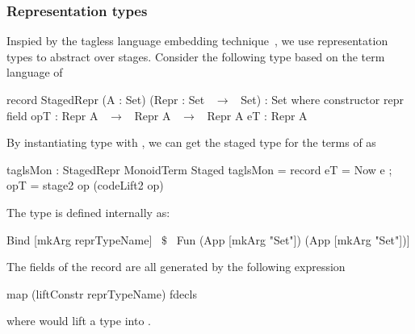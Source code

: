\begin{comment}
Constants and variable are staged with The automatic annotation is done by Lifting constants from term language to staged term language is done by adding the \lstmath{Now} constructor of the \lstmath{Staged} before the constant symbol 
\begin{hscode} 
liftConstant :: Constr -> (Pattern,Expr) 
liftConstant c = (mkPattern c, App [mkArg "Now",Arg ~$\$$~ fappExpr c])
\end{hscode} 
In a similar way, a variable of the form \lstmath{v x} is lifted to the \lstmath{Staged} expression \\
\lstmath{(Later (Computation Const x))}.
\end{comment}

\subsubsection{Representation types}
\label{sec:generation:tagless}
Inspied by the tagless language embedding technique~\cite{carette2009finally}, we use representation types to abstract over stages. Consider the following type based on the term language of  
\begin{togcode}
record StagedRepr (A : Set) (Repr : Set ~$\to$~ Set) : Set where
 constructor repr
 field
   opT : Repr A ~$\to$~ Repr A ~$\to$~ Repr A
   eT  : Repr A
\end{togcode}
By instantiating  type with , we can get the staged type for the terms of  as 
\begin{togcode}
taglsMon : StagedRepr MonoidTerm Staged 
taglsMon = record {eT = Now e ; opT = stage2 op (codeLift2 op)}
\end{togcode}

The type  is defined internally as:  
\begin{hscode} 
Bind [mkArg reprTypeName] ~$\$$~ Fun (App [mkArg "Set"]) (App [mkArg "Set"])]
\end{hscode} 
The fields of the record are all generated by the following expression 
\begin{hscode} 
map (liftConstr reprTypeName) fdecls
\end{hscode} 
\noindent where  would lift a type  into . 


